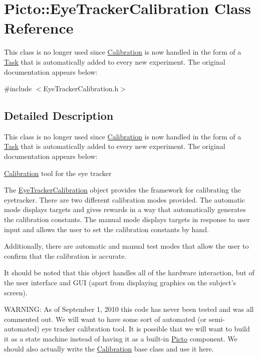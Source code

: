 \hypertarget{class_picto_1_1_eye_tracker_calibration}{\section{Picto\-:\-:Eye\-Tracker\-Calibration Class Reference}
\label{class_picto_1_1_eye_tracker_calibration}
}


This class is no longer used since \hyperlink{class_picto_1_1_calibration}{Calibration} is now handled in the form of a \hyperlink{class_picto_1_1_task}{Task} that is automatically added to every new experiment. The original documentation appears below\-:  




{\ttfamily \#include $<$Eye\-Tracker\-Calibration.\-h$>$}



\subsection{Detailed Description}
This class is no longer used since \hyperlink{class_picto_1_1_calibration}{Calibration} is now handled in the form of a \hyperlink{class_picto_1_1_task}{Task} that is automatically added to every new experiment. The original documentation appears below\-: 

\hyperlink{class_picto_1_1_calibration}{Calibration} tool for the eye tracker

The \hyperlink{class_picto_1_1_eye_tracker_calibration}{Eye\-Tracker\-Calibration} object provides the framework for calibrating the eyetracker. There are two different calibration modes provided. The automatic mode displays targets and gives rewards in a way that automatically generates the calibration constants. The manual mode displays targets in response to user input and allows the user to set the calibration constants by hand.

Additionally, there are automatic and manual test modes that allow the user to confirm that the calibration is accurate.

It should be noted that this object handles all of the hardware interaction, but of the user interface and G\-U\-I (apart from displaying graphics on the subject's screen).

W\-A\-R\-N\-I\-N\-G\-: As of September 1, 2010 this code has never been tested and was all commented out. We will want to have some sort of automated (or semi-\/automated) eye tracker calibration tool. It is possible that we will want to build it as a state machine instead of having it as a built-\/in \hyperlink{namespace_picto}{Picto} component. We should also actually write the \hyperlink{class_picto_1_1_calibration}{Calibration} base class and use it here. 

